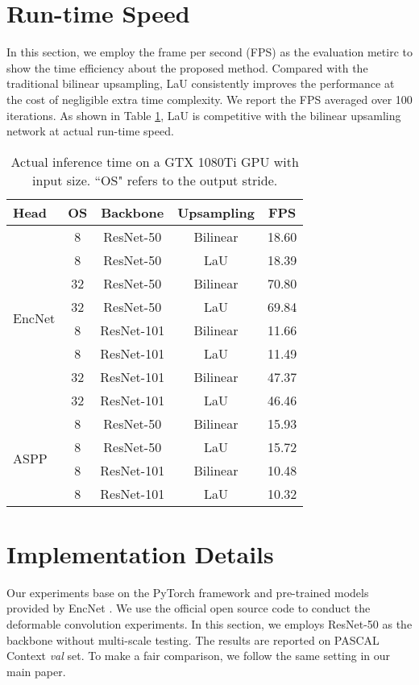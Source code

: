 \documentclass[10pt,twocolumn,letterpaper]{article}
\begin{document}
{\small


}

\appendix

\section{Run-time Speed}
In this section, we employ the frame per second (FPS) as the evaluation metirc to show the time efficiency about the proposed method. Compared with the traditional bilinear upsampling, LaU consistently improves the performance at the cost of negligible extra time complexity. We report the FPS averaged over 100 iterations.  As shown in Table \ref{fps}, LaU is competitive with the bilinear upsamling network at actual run-time speed.

\begin{table}[th]
  \caption{Actual inference time on a GTX 1080Ti GPU with  input size. ``OS" refers to the output stride. }
  \label{sample-table}
  \centering
\begin{tabular}{l | cccc}
\hline 
    Head     &   OS   & Backbone &  Upsampling & FPS\\
\hline   
\hline
\multirow{8}{*}{EncNet \cite{EncNet}} & 8 & ResNet-50 & Bilinear & 18.60\\
 & 8 & ResNet-50 & LaU & 18.39\\
\cline{2-5}
& 32 & ResNet-50 & Bilinear & 70.80\\
& 32 & ResNet-50 & LaU & 69.84\\
\cline{2-5}
& 8 & ResNet-101 & Bilinear & 11.66\\
 & 8 & ResNet-101 & LaU & 11.49\\
\cline{2-5}
& 32 & ResNet-101 & Bilinear & 47.37\\
& 32 & ResNet-101 & LaU & 46.46\\
\hline 
\hline 
\multirow{4}{*}{ASPP \cite{ASPP}} & 8 & ResNet-50 & Bilinear & 15.93\\
 & 8 & ResNet-50 & LaU & 15.72\\
\cline{2-5}
& 8 & ResNet-101 & Bilinear & 10.48\\
& 8 & ResNet-101 & LaU & 10.32\\
\hline 
\hline 
  \end{tabular}
\label{fps}
\end{table}

\section{Implementation Details}
Our experiments base on the PyTorch framework \cite{paszke2017automatic} and pre-trained models provided by EncNet \cite{EncNet}. We use the official open source code \cite{ZhuHLD19} to conduct the deformable convolution experiments. In this section, we employs ResNet-50 as the backbone without multi-scale testing. The results are reported on PASCAL Context \textit{val} set. To make a fair comparison, we follow the same setting in our main paper.
\end{document}
